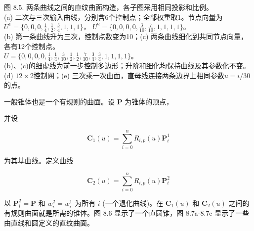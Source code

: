\documentclass[../main.tex]{subfiles}
\begin{document}
\begin{center}
\begin{minipage}{30cm}
\vspace*{.6\baselineskip}
\centering
{}
\par\medskip
{}
\par\medskip
\begin{minipage}{14.3cm}\centering
{}
\end{minipage}\hfill
\begin{minipage}{14.3cm}\centering
{}
\end{minipage}
\par\smallskip
图 8.5. 两条曲线之间的直纹曲面构造，各子图采用相同投影和比例。\\
(a) 二次与三次输入曲线，分别含6个控制点；全部权重取1。节点向量为\\
\(U^1=\{0,0,0,\tfrac14,\tfrac12,\tfrac34,1,1,1\}\)，
\(U^2=\{0,0,0,0,\tfrac3{10},\tfrac7{10},1,1,1,1\}\)。\\
(b) 第一条曲线升为三次，控制点数变为10；(c) 两条曲线细化到共同节点向量，各有12个控制点。\\
\(U=\{0,0,0,0,\tfrac14,\tfrac14,\tfrac3{10},\tfrac12,\tfrac12,\tfrac7{10},\tfrac34,\tfrac34,1,1,1,1\}\)。\\
(b)、(c)的细虚线为前一步控制多边形；升阶和细化均保持曲线及其参数化不变。\\
(d) \(12\times2\)控制网；(e) 三次乘一次曲面，直母线连接两条边界上相同参数\(u=i/30\)的点。
\end{minipage}
\end{center}

一般锥体也是一个有规则的曲面。设 \(\mathbf{P}\) 为锥体的顶点，

并设

\[
{\mathbf{C}}_{1}\left( u\right)  = \mathop{\sum }\limits_{{i = 0}}^{n}{R}_{i,p}\left( u\right) {\mathbf{P}}_{i}^{1}
\]

为其基曲线。定义曲线

\[
{\mathbf{C}}_{2}\left( u\right)  = \mathop{\sum }\limits_{{i = 0}}^{n}{R}_{i,p}\left( u\right) {\mathbf{P}}_{i}^{2}
\]

以 \({\mathbf{P}}_{i}^{2} = \mathbf{P}\) 和 \({w}_{i}^{2} = {w}_{i}^{1}\) 为所有 \(i\) (一个退化曲线)。在 \({\mathbf{C}}_{1}\left( u\right)\) 和 \({\mathbf{C}}_{2}\left( u\right)\) 之间的有规则曲面就是所需的锥体。图 8.6 显示了一个直圆锥，图 8.7a-8.7c 显示了一些由直线和圆定义的直纹曲面。
\end{document}
